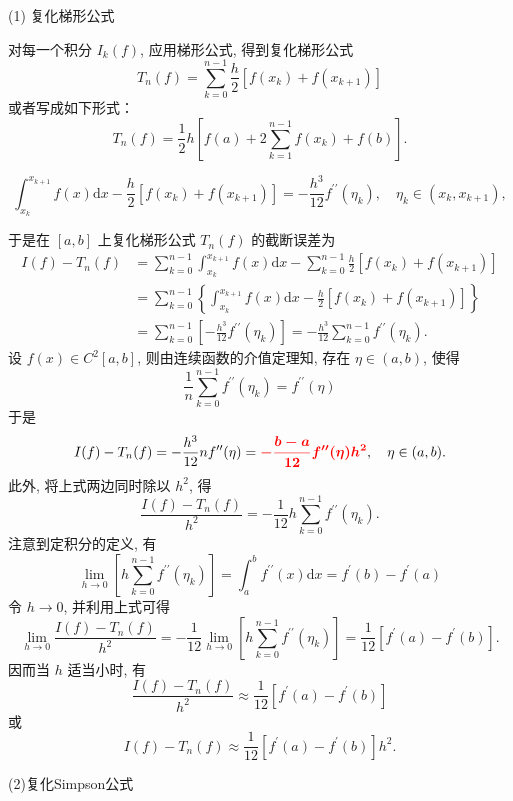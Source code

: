 (1) 复化梯形公式

对每一个积分 $ I_{k}(f) $, 应用梯形公式, 得到复化梯形公式
$$
T_{n}(f)=\sum_{k=0}^{n-1} \frac{h}{2}\left[f\left(x_{k}\right)+f\left(x_{k+1}\right)\right]
$$
或者写成如下形式：
$$
T_{n}(f)=\frac{1}{2} h\left[f\left(a\right)+2 \sum_{k=1}^{n-1} f\left(x_{k}\right)+f\left(b\right)\right] .
$$

$$
\int_{x_{k}}^{x_{k+1}} f(x) \mathrm{d} x-\frac{h}{2}\left[f\left(x_{k}\right)+f\left(x_{k+1}\right)\right]=-\frac{h^{3}}{12} f^{\prime \prime}\left(\eta_{k}\right), \quad \eta_{k} \in\left(x_{k}, x_{k+1}\right),
$$

于是在 $ [a, b] $ 上复化梯形公式 $ T_{n}(f) $ 的截断误差为
$$
\begin{aligned}
I(f)-T_{n}(f) & =\sum_{k=0}^{n-1} \int_{x_{k}}^{x_{k+1}} f(x) \mathrm{d} x-\sum_{k=0}^{n-1} \frac{h}{2}\left[f\left(x_{k}\right)+f\left(x_{k+1}\right)\right] \\
& =\sum_{k=0}^{n-1}\left\{\int_{x_{k}}^{x_{k+1}} f(x) \mathrm{d} x-\frac{h}{2}\left[f\left(x_{k}\right)+f\left(x_{k+1}\right)\right]\right\} \\
& =\sum_{k=0}^{n-1}\left[-\frac{h^{3}}{12} f^{\prime \prime}\left(\eta_{k}\right)\right]=-\frac{h^{3}}{12} \sum_{k=0}^{n-1} f^{\prime \prime}\left(\eta_{k}\right) .
\end{aligned}
$$
设 $ f(x) \in C^{2}[a, b] $, 则由连续函数的介值定理知, 存在 $ \eta \in(a, b) $, 使得
$$
\frac{1}{n} \sum_{k=0}^{n-1} f^{\prime \prime}\left(\eta_{k}\right)=f^{\prime \prime}(\eta)
$$
于是
$$
I(f)-T_{n}(f)=-\frac{h^{3}}{12} n f^{\prime \prime}(\eta)=\textcolor{red}{\bm{-\frac{b-a}{12} f^{\prime \prime}(\eta) h^{2}}}, \quad \eta \in(a, b) .
$$
此外, 将上式两边同时除以 $ h^{2} $, 得
$$
\frac{I(f)-T_{n}(f)}{h^{2}}=-\frac{1}{12} h \sum_{k=0}^{n-1} f^{\prime \prime}\left(\eta_{k}\right) .
$$
注意到定积分的定义, 有
$$
\lim _{h \rightarrow 0}\left[h \sum_{k=0}^{n-1} f^{\prime \prime}\left(\eta_{k}\right)\right]=\int_{a}^{b} f^{\prime \prime}(x) \mathrm{d} x=f^{\prime}(b)-f^{\prime}(a)
$$
令 $ h \rightarrow 0 $, 并利用上式可得
$$
\lim _{h \rightarrow 0} \frac{I(f)-T_{n}(f)}{h^{2}}=-\frac{1}{12} \lim _{h \rightarrow 0}\left[h \sum_{k=0}^{n-1} f^{\prime \prime}\left(\eta_{k}\right)\right]=\frac{1}{12}\left[f^{\prime}(a)-f^{\prime}(b)\right] .
$$
因而当 $ h $ 适当小时, 有
$$
\frac{I(f)-T_{n}(f)}{h^{2}} \approx \frac{1}{12}\left[f^{\prime}(a)-f^{\prime}(b)\right]
$$
或
$$
I(f)-T_{n}(f) \approx \frac{1}{12}\left[f^{\prime}(a)-f^{\prime}(b)\right] h^{2} .
$$

(2)复化Simpson公式

